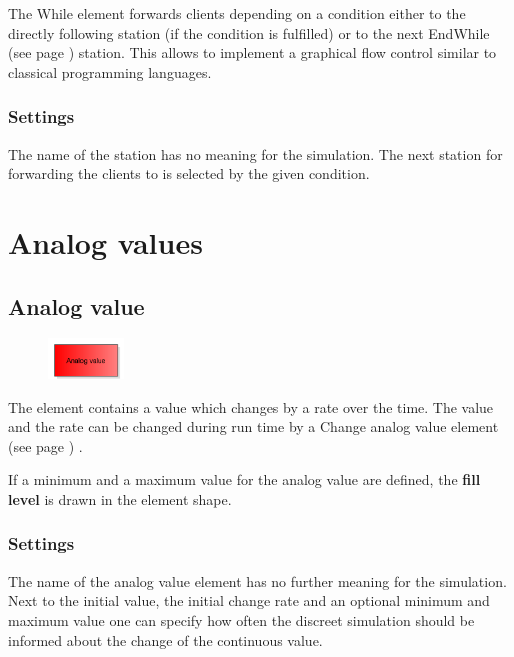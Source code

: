 The While element forwards clients depending on a condition either to the directly following station
(if the condition is fulfilled) or to the next EndWhile (see page \pageref{ref:ModelElementLogicEndWhile}) 
station. This allows to implement a graphical flow control similar to classical programming
languages.

\subsection*{Settings}

The name of the station has no meaning for the simulation.
The next station for forwarding the clients to is selected by the given condition.





\chapter{Analog values}

\section{Analog value}
\label{ref:ModelElementAnalogValue}

\begin{figure}
\vspace{-22pt}
\includegraphics[width=2cm]{imageModelElementAnalogValue.png}
\vspace{-22pt}
\end{figure}

The element contains a value which changes by a rate over the time.
The value and the rate can be changed during run time by a
Change analog value element (see page \pageref{ref:ModelElementAnalogAssign}) .

If a minimum and a maximum value for the analog value are defined,
the \textbf{fill level} is drawn in the element shape.

\subsection*{Settings}

The name of the analog value element has no further meaning for the simulation.
Next to the initial value, the initial change rate and an optional minimum and maximum value
one can specify how often the discreet simulation should be informed about the change of
the continuous value.



